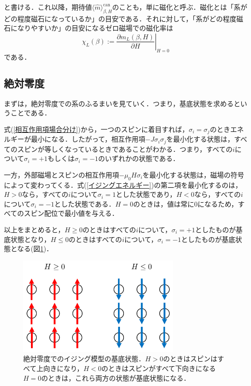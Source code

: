 \documentclass[a4paper,11pt]{jsreport}
\begin{document}
と書ける．これ以降，期待値$\langle \hat{m} \rangle_{\beta, H}^{\text{can}}$のことも，単に磁化と呼ぶ．磁化とは「系がどの程度磁石になっているか」の目安である．それに対して，「系がどの程度磁石になりやすいか」の目安になるゼロ磁場での磁化率は
\begin{equation}
  \chi_L(\beta) := \left.\frac{\partial m_L(\beta, H)}{\partial H}\right|_{H=0}
\end{equation}
である．
\subsection{絶対零度}
まずは，絶対零度での系のふるまいを見ていく．つまり，基底状態を求めるということである．\par
式(\ref{相互作用項場合分け})から，一つのスピンに着目すれば，$\sigma_i = \sigma_j$のときエネルギーが最小になる．したがって，相互作用項$-J\sigma_i \sigma_j$を最小化する状態は，すべてのスピンが等しくなっているときであることがわかる．つまり，すべての$i$について$\sigma_i = +1$もしくは$\sigma_i = -1$のいずれかの状態である．\par
一方，外部磁場とスピンの相互作用項$-\mu_0 H \sigma_i$を最小化する状態は，磁場の符号によって変わってくる．式(\ref{イジングエネルギー})の第二項を最小化するのは，$H>0$なら，すべての$i$について$\sigma_i=1$とした状態であり，$H<0$なら，すべての$i$について$\sigma_i=-1$とした状態である．$H=0$のときは，値は常に$0$になるため，すべてのスピン配位で最小値を与える．\par
以上をまとめると，$H \geq 0$のときはすべての$i$について，$\sigma_i=+1$としたものが基底状態となり，$H \leq 0$のときはすべての$i$について，$\sigma_i=-1$としたものが基底状態となる(図\ref{絶対零度スピン配位})．\par
\begin{figure}[h]
  \begin{center}
    \includegraphics[height=5cm]{image/絶対零度スピン配位.png}
    \caption{絶対零度でのイジング模型の基底状態．$H>0$のときはスピンはすべて上向きになり，$H<0$のときはスピンがすべて下向きになる$H=0$のときは，これら両方の状態が基底状態になる． \label{絶対零度スピン配位}}
  \end{center}
\end{figure}
\end{document}
